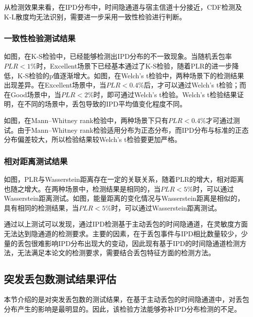 从检测效果来看，在IPD分布中，时间隐通道与宿主信道十分接近，CDF检测及K-L散度均无法识别，需要进一步采用一致性检验进行判断。

\subsubsection{一致性检验测试结果}
\label{chap:analyze:result:ipd:statistical}

如图，在K-S检验中，已经能够检测出IPD分布的不一致现象。当随机丢包率$PLR<1\%$时，Excellent场景下已经基本通过了K-S检验，随着PLR的进一步降低，K-S检验的p值逐渐增大。如图，在Welch's t检验中，两种场景下的检测结果出现差异。在Excellent场景中，当$PLR<0.4\%$后，才可以通过Welch's t检验；而在Good场景中，当$PLR<2\%$时，即可通过Welch's t检验。Welch's t检验结果证明，在不同的场景中，丢包导致的IPD平均值变化程度不同。

如图，在Mann–Whitney rank检验中，两种场景下只有$PLR<0.4\%$才可通过测试。由于Mann–Whitney rank检验适用分布为正态分布，而IPD分布与标准的正态分布偏差较大，所以检验结果较Welch's t检验要更加严格。

\subsubsection{相对距离测试结果}
\label{chap:analyze:result:ipd:distance}

如图，PLR与Wasserstein距离存在一定的关联关系，随着PLR的增大，相对距离也随之增大。在两种场景中，检测结果是相同的，当$PLR<5\%$时，可以通过Wasserstein距离测试。如图，能量距离的变化情况与Wasserstein距离是相似的，具有相同的检测结果，当$PLR<5\%$时，可以通过Wasserstein距离测试。

通过以上测试可以发现，通过IPD检测基于主动丢包的时间隐通道，在灵敏度方面无法达到隐通道的检测要求。主要的因素，在于丢包事件与IPD相比数量较少，少量的丢包很难影响IPD分布出现大的变动，因此现有基于IPD的时间隐通道检测方法，无法满足本论文的检测要求，需要结合丢包特征方面的检测方法。

\subsection{突发丢包数测试结果评估}
\label{chap:analyze:result:burst}

本节介绍的是对突发丢包数的测试结果，在基于主动丢包的时间隐通道中，对丢包分布产生的影响是最明显的。因此，该检验方法能够弥补IPD分布检测的不足。

